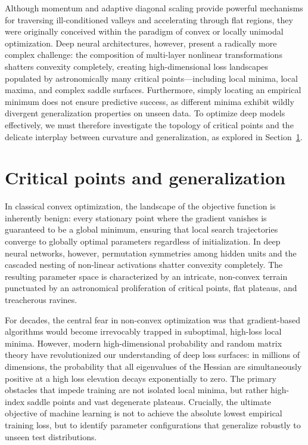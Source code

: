 Although momentum and adaptive diagonal scaling provide powerful mechanisms for traversing ill-conditioned valleys and accelerating through flat regions, they were originally conceived within the paradigm of convex or locally unimodal optimization. Deep neural architectures, however, present a radically more complex challenge: the composition of multi-layer nonlinear transformations shatters convexity completely, creating high-dimensional loss landscapes populated by astronomically many critical points---including local minima, local maxima, and complex saddle surfaces. Furthermore, simply locating an empirical minimum does not ensure predictive success, as different minima exhibit wildly divergent generalization properties on unseen data. To optimize deep models effectively, we must therefore investigate the topology of critical points and the delicate interplay between curvature and generalization, as explored in Section~\ref{sec:critical_points_deep_learning}.

\section{Critical points and generalization}
\label{sec:critical_points_deep_learning}

In classical convex optimization, the landscape of the objective function is inherently benign: every stationary point where the gradient vanishes is guaranteed to be a global minimum, ensuring that local search trajectories converge to globally optimal parameters regardless of initialization. In deep neural networks, however, permutation symmetries among hidden units and the cascaded nesting of non-linear activations shatter convexity completely. The resulting parameter space is characterized by an intricate, non-convex terrain punctuated by an astronomical proliferation of critical points, flat plateaus, and treacherous ravines.

For decades, the central fear in non-convex optimization was that gradient-based algorithms would become irrevocably trapped in suboptimal, high-loss local minima. However, modern high-dimensional probability and random matrix theory have revolutionized our understanding of deep loss surfaces: in millions of dimensions, the probability that all eigenvalues of the Hessian are simultaneously positive at a high loss elevation decays exponentially to zero. The primary obstacles that impede training are not isolated local minima, but rather high-index saddle points and vast degenerate plateaus. Crucially, the ultimate objective of machine learning is not to achieve the absolute lowest empirical training loss, but to identify parameter configurations that generalize robustly to unseen test distributions.


